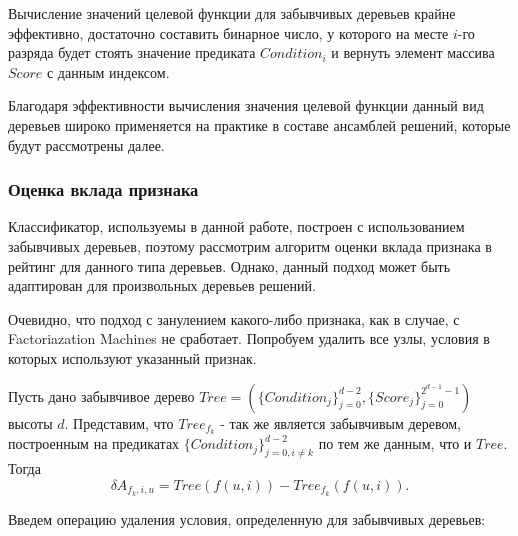 \documentclass[12pt,a4paper]{report}
\begin{document}
Вычисление значений целевой функции для забывчивых деревьев крайне эффективно, достаточно составить бинарное число, у которого на месте $i$-го разряда будет стоять значение предиката $Condition_i$ и вернуть элемент массива $Score$ с данным индексом.

Благодаря эффективности вычисления значения целевой функции данный вид деревьев широко применяется на практике в составе ансамблей решений, которые будут рассмотрены далее.

\subsubsection{Оценка вклада признака}
Классификатор, используемы в данной работе, построен с использованием забывчивых деревьев, поэтому рассмотрим алгоритм оценки вклада признака в рейтинг для данного типа деревьев. Однако, данный подход может быть адаптирован для произвольных деревьев решений.

Очевидно, что подход с занулением какого-либо признака, как в случае, с Factoriazation Machines не сработает. Попробуем удалить все узлы, условия в которых используют указанный признак.

Пусть дано забывчивое дерево $Tree = (\{Condition_j\}_{j=0}^{d - 2}, \{Score_j\}_{j=0}^{2^{d - 1} - 1})$ высоты $d$.
Представим, что $Tree_{f_k}$ - так же является забывчивым деревом, построенным на предикатах $\{Condition_j\}_{j=0, i \neq k}^{d - 2}$ по тем же данным, что и $Tree$. Тогда
\begin{equation*}
\delta A_{f_k, i, u} = Tree(f(u, i)) - Tree_{f_k}(f(u, i)).
\end{equation*}

Введем операцию удаления условия, определенную для забывчивых деревьев:
\end{document}
